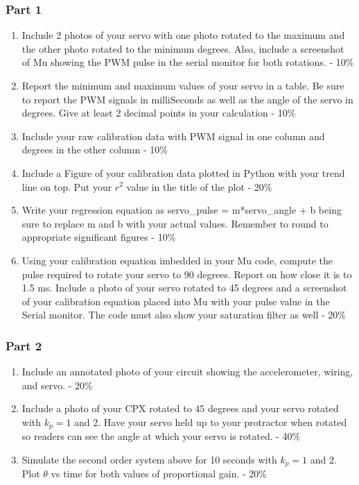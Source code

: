 

\subsubsection{Part 1}
\begin{enumerate}[itemsep=-5pt]
\item Include 2 photos of your servo with one photo rotated to the maximum and the other photo rotated to the minimum degrees. Also, include a screenshot of Mu showing the PWM pulse in the serial monitor for both rotations. - 10\%
\item Report the minimum and maximum values of your servo in a table. Be sure to report the PWM signals in milliSeconds as well as the angle of the servo in degrees. Give at least 2 decimal points in your calculation - 10\%
\item Include your raw calibration data with PWM signal in one column and degrees in the other column - 10\%
\item Include a Figure of your calibration data plotted in Python with your trend line on top. Put your $r^2$ value in the title of the plot - 20\%
\item Write your regression equation as servo\_pulse = m*servo\_angle + b being sure to replace m and b with your actual values. Remember to round to appropriate significant figures - 10\% 
\item Using your calibration equation imbedded in your Mu code, compute the pulse required to rotate your servo to 90 degrees. Report on how close it is to 1.5 ms. Include a photo of your servo rotated to 45 degrees and a screenshot of your calibration equation placed into Mu with your pulse value in the Serial monitor. The code must also show your saturation filter as well - 20\%
\end{enumerate}

\subsubsection{Part 2}
\begin{enumerate}[itemsep=-5pt]
\item Include an annotated photo of your circuit showing the accelerometer, wiring, and servo. - 20\%
\item Include a photo of your CPX rotated to 45 degrees and your servo rotated with $k_p=1$ and 2. Have your servo held up to your protractor when rotated so readers can see the angle at which your servo is rotated. - 40\%
\item Simulate the second order system above for 10 seconds with $k_p=1$ and 2. Plot $\theta$ vs time for both values of proportional gain. - 20\%
\end{enumerate}
